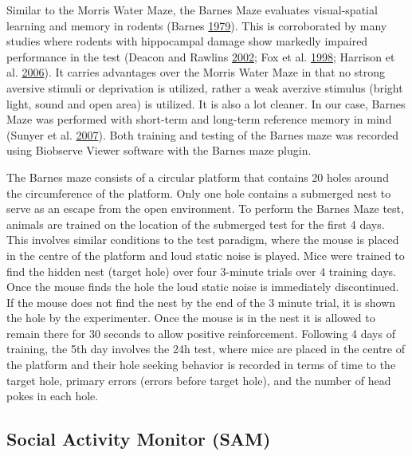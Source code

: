 \documentclass[onehalf,12pt]{beavtex}
\begin{document}
  Similar to the Morris Water Maze, the Barnes Maze evaluates
  visual-spatial learning and memory in rodents (Barnes
  \protect\hyperlink{ref-BarnesMemorydeficitsassociated1979}{1979}). This
  is corroborated by many studies where rodents with hippocampal damage
  show markedly impaired performance in the test (Deacon and Rawlins
  \protect\hyperlink{ref-DeaconLearningimpairmentshippocampallesioned2002}{2002};
  Fox et al. \protect\hyperlink{ref-FoxEffectTraumaticBrain1998}{1998};
  Harrison et al.
  \protect\hyperlink{ref-HarrisonSpatialnonspatialescape2006}{2006}). It
  carries advantages over the Morris Water Maze in that no strong aversive
  stimuli or deprivation is utilized, rather a weak averzive stimulus
  (bright light, sound and open area) is utilized. It is also a lot
  cleaner. In our case, Barnes Maze was performed with short-term and
  long-term reference memory in mind (Sunyer et al.
  \protect\hyperlink{ref-SunyerBarnesmazeuseful2007}{2007}). Both training
  and testing of the Barnes maze was recorded using Biobserve Viewer
  software with the Barnes maze plugin.
  
  The Barnes maze consists of a circular platform that contains 20 holes
  around the circumference of the platform. Only one hole contains a
  submerged nest to serve as an escape from the open environment. To
  perform the Barnes Maze test, animals are trained on the location of the
  submerged test for the first 4 days. This involves similar conditions to
  the test paradigm, where the mouse is placed in the centre of the
  platform and loud static noise is played. Mice were trained to find the
  hidden nest (target hole) over four 3-minute trials over 4 training
  days. Once the mouse finds the hole the loud static noise is immediately
  discontinued. If the mouse does not find the nest by the end of the 3
  minute trial, it is shown the hole by the experimenter. Once the mouse
  is in the nest it is allowed to remain there for 30 seconds to allow
  positive reinforcement. Following 4 days of training, the 5th day
  involves the 24h test, where mice are placed in the centre of the
  platform and their hole seeking behavior is recorded in terms of time to
  the target hole, primary errors (errors before target hole), and the
  number of head pokes in each hole.
  
  \subsection{Social Activity Monitor
  (SAM)}\label{social-activity-monitor-sam-1}
  
\end{document}
